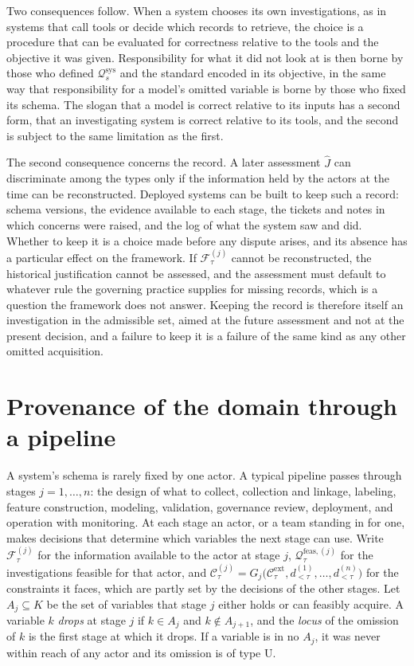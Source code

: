 \documentclass[11pt]{article}
\newcommand{\F}{\mathcal F}
\newcommand{\Q}{\mathcal Q}
\newcommand{\C}{\mathcal C}
\newcommand{\feas}{\mathrm{feas}}
\theoremstyle{plain}
\theoremstyle{definition}
\begin{document}
Two consequences follow. When a system chooses its own investigations, as in systems that call tools or decide which records to retrieve, the choice is a procedure that can be evaluated for correctness relative to the tools and the objective it was given. Responsibility for what it did not look at is then borne by those who defined $\Q_s^{\mathrm{sys}}$ and the standard encoded in its objective, in the same way that responsibility for a model's omitted variable is borne by those who fixed its schema. The slogan that a model is correct relative to its inputs has a second form, that an investigating system is correct relative to its tools, and the second is subject to the same limitation as the first.

The second consequence concerns the record. A later assessment $\widehat J$ can discriminate among the types only if the information held by the actors at the time can be reconstructed. Deployed systems can be built to keep such a record: schema versions, the evidence available to each stage, the tickets and notes in which concerns were raised, and the log of what the system saw and did. Whether to keep it is a choice made before any dispute arises, and its absence has a particular effect on the framework. If $\F_\tau^{(j)}$ cannot be reconstructed, the historical justification cannot be assessed, and the assessment must default to whatever rule the governing practice supplies for missing records, which is a question the framework does not answer. Keeping the record is therefore itself an investigation in the admissible set, aimed at the future assessment and not at the present decision, and a failure to keep it is a failure of the same kind as any other omitted acquisition.

\section{Provenance of the domain through a pipeline}

A system's schema is rarely fixed by one actor. A typical pipeline passes through stages $j=1,\ldots,n$: the design of what to collect, collection and linkage, labeling, feature construction, modeling, validation, governance review, deployment, and operation with monitoring. At each stage an actor, or a team standing in for one, makes decisions that determine which variables the next stage can use. Write $\F^{(j)}_\tau$ for the information available to the actor at stage $j$, $\Q^{\feas,(j)}_\tau$ for the investigations feasible for that actor, and $\C^{(j)}_\tau=G_j\bigl(\C^{\mathrm{ext}}_\tau,d^{(1)}_{<\tau},\ldots,d^{(n)}_{<\tau}\bigr)$ for the constraints it faces, which are partly set by the decisions of the other stages. Let $A_j\subseteq K$ be the set of variables that stage $j$ either holds or can feasibly acquire. A variable $k$ \emph{drops} at stage $j$ if $k\in A_j$ and $k\notin A_{j+1}$, and the \emph{locus} of the omission of $k$ is the first stage at which it drops. If a variable is in no $A_j$, it was never within reach of any actor and its omission is of type U.
\end{document}
